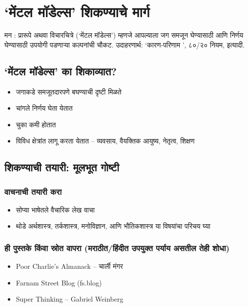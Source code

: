 \chapter{`मेंटल मॉडेल्स' शिकण्याचे मार्ग}

मन : प्रारूपे अथवा विचारचित्रे (`मेंटल मॉडेल्स') म्हणजे आपल्याला जग समजून घेण्यासाठी आणि निर्णय घेण्यासाठी उपयोगी पडणाऱ्या कल्पनांची चौकट. उदाहरणार्थ: `कारण-परिणाम ', ८०/२० नियम, इत्यादी.

\section{`मेंटल मॉडेल्स' का शिकाव्यात?}
	\begin{itemize}
		\item जगाकडे समजूतदारपणे बघण्याची दृष्टी मिळते
		\item  चांगले निर्णय घेता येतात
		\item  चुका कमी होतात
		\item  विविध क्षेत्रांत लागू करता येतात – व्यवसाय, वैयक्तिक आयुष्य, नेतृत्व, शिक्षण
	\end{itemize}

\section{ शिकण्याची तयारी: मूलभूत गोष्टी}

\subsection{वाचनाची तयारी करा}

	\begin{itemize}
		\item सोप्या भाषेतले वैचारिक लेख वाचा
		\item  थोडे अर्थशास्त्र, तर्कशास्त्र, मनोविज्ञान, आणि भौतिकशास्त्र या विषयांचा परिचय घ्या
	\end{itemize}

\subsection{ही पुस्तके किंवा स्रोत वापरा (मराठीत/हिंदीत उपयुक्त पर्याय असतील तेही शोधा)}

	\begin{itemize}
		\item Poor Charlie’s Almanack – चार्ली मंगर
		\item Farnam Street Blog (fs.blog)
		\item Super Thinking – Gabriel Weinberg
	\end{itemize}


